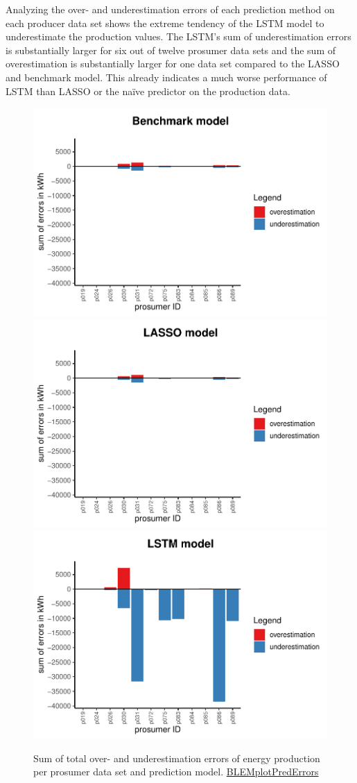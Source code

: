 Analyzing the over- and underestimation errors of each prediction method on each producer data set shows the extreme tendency of the LSTM model to underestimate the production values. The LSTM's sum of underestimation errors is substantially larger for six out of twelve prosumer data sets and the sum of overestimation is substantially larger for one data set compared to the LASSO and benchmark model. This already indicates a much worse performance of LSTM than LASSO or the na\"ive predictor on the production data.
%
\begin{figure}
    \centering
    \includegraphics[width=.5\textwidth]{thesis/graphs/evaluation/p_barplot_naive_overunderestimation.pdf}\\\vspace{.6cm}
    \includegraphics[width=.5\textwidth]{thesis/graphs/evaluation/p_barplot_LASSO_overunderestimation.pdf}\\\vspace{.6cm}
    \includegraphics[width=.5\textwidth]{thesis/graphs/evaluation/p_barplot_LSTM_overunderestimation.pdf}
    \caption[Sum of total over- and underestimation errors per prosumer data set]{Sum of total over- and underestimation errors of energy production per prosumer data set and prediction model. \quantnet\href{https://github.com/QuantLet/BLEM/tree/master/BLEMplotPredErrors}{BLEMplotPredErrors}}
    \label{Fig:overunderestimation_p}
\end{figure}
%


